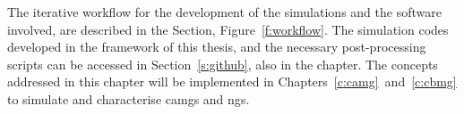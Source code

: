 The iterative workflow for the development of the simulations and the software involved, are described in the  Section, Figure~\ref{f:workflow}. The simulation codes developed in the framework of this thesis, and the necessary post-processing scripts can be accessed in Section~\ref{s:github}, also in the  chapter. The concepts addressed in this chapter will be implemented in Chapters~\ref{c:camg}~and~\ref{c:cbmg} to simulate and characterise \gls{camg}s and \gls{ng}s.